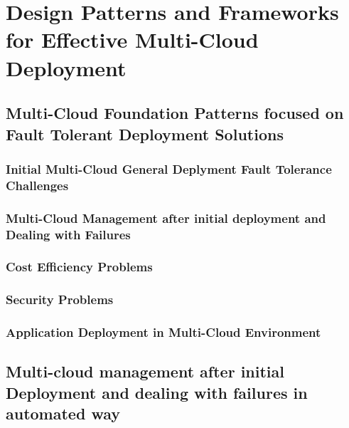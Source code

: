 \documentclass[12pt]{article}
\begin{document}
		
	\section{Design Patterns and Frameworks for Effective Multi-Cloud Deployment}
	
	\subsection{Multi-Cloud Foundation Patterns focused on Fault Tolerant Deployment Solutions}	

	\subsubsection{Initial Multi-Cloud General Deplyment Fault Tolerance Challenges}
	
	\subsubsection{Multi-Cloud Management after initial deployment and Dealing with Failures}
	
	\subsubsection{Cost Efficiency Problems}
	
	\subsubsection{Security Problems}
	
	\subsubsection{Application Deployment in Multi-Cloud Environment}
	
	\subsection{Multi-cloud management after initial Deployment and dealing with failures in automated way}
	
\end{document}
